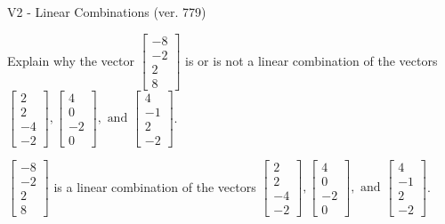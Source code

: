 \begin{exercise}
  \begin{exerciseTitle}V2 - Linear Combinations (ver. 779)\end{exerciseTitle}
  \begin{exerciseStatement}
    Explain why the vector \(\left[\begin{array}{c}
-8 \\
-2 \\
2 \\
8
\end{array}\right]\)  is or is not a linear 
	combination of the vectors \(\left[\begin{array}{c}
2 \\
2 \\
-4 \\
-2
\end{array}\right] , \left[\begin{array}{c}
4 \\
0 \\
-2 \\
0
\end{array}\right] , \text{ and } \left[\begin{array}{c}
4 \\
-1 \\
2 \\
-2
\end{array}\right]\).
	


  \end{exerciseStatement}
  \begin{exerciseAnswer}
   \(\left[\begin{array}{c}
-8 \\
-2 \\
2 \\
8
\end{array}\right]\) 
  	 is  
	a linear combination of the vectors \(\left[\begin{array}{c}
2 \\
2 \\
-4 \\
-2
\end{array}\right] , \left[\begin{array}{c}
4 \\
0 \\
-2 \\
0
\end{array}\right] , \text{ and } \left[\begin{array}{c}
4 \\
-1 \\
2 \\
-2
\end{array}\right]\).

	
  


  \end{exerciseAnswer}
\end{exercise}